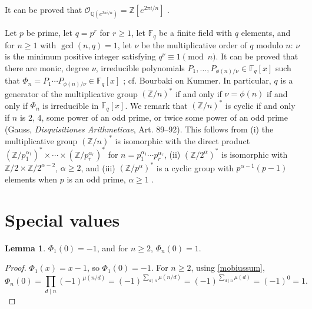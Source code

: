 \documentclass{article}
\theoremstyle{definition}
\newtheorem{lemma}[theorem]{Lemma}
\theoremstyle{definition}
\begin{document}
It can be proved that $\mathcal{O}_{\mathbb{Q}(e^{2\pi i/n})} = \mathbb{Z}[e^{2\pi i/n}]$ \cite[p.~60, Proposition 10.2]{neukirch}.







Let $p$ be prime, let $q=p^r$ for $r \geq 1$,  let $\mathbb{F}_q$ be a finite field with $q$ elements,
and for $n \geq 1$ with $\gcd(n,q)=1$, let $\nu$ be the multiplicative order of $q$ modulo $n$: $\nu$ is the minimum positive
integer satisfying $q^\nu \equiv 1 \pmod{n}$. It can be proved that
there are monic, degree $\nu$, irreducible polynomials
$P_1,\ldots,P_{\phi(n)/\nu} \in \mathbb{F}_q[x]$ such that
$\Phi_n = P_1 \cdots P_{\phi(n)/\nu} \in \mathbb{F}_q[x]$ \cite[p.~65, Theorem 2.47]{lidl}; cf.
Bourbaki \cite[p.~581]{commutative} on Kummer.
In particular, $q$ is a generator of the multiplicative group $(\mathbb{Z}/n)^*$ if and only if
$\nu=\phi(n)$ if and only if $\Phi_n$ is irreducible in $\mathbb{F}_q[x]$. We remark that $(\mathbb{Z}/n)^*$ is cyclic if and only if
$n$ is $2$, $4$, some power of an odd prime, or twice some power of an odd prime (Gauss, {\em Disquisitiones Arithmeticae}, Art. 89--92).
This 
 follows from (i) the multiplicative group $(\mathbb{Z}/n)^*$ is isomorphic with the direct product
$(\mathbb{Z}/p_1^{\alpha_1})^* \times \cdots \times (\mathbb{Z}/p_r^{\alpha_r})^*$ for $n=p_1^{\alpha_1} \cdots p_r^{\alpha_r}$,
(ii) $(\mathbb{Z}/2^\alpha)^*$ is isomorphic with $\mathbb{Z}/2 \times \mathbb{Z}/2^{\alpha-2}$, $\alpha \geq 2$,
and (iii) $(\mathbb{Z}/p^\alpha)^*$ is a cyclic group with $p^{\alpha-1}(p-1)$ elements when $p$ is an odd
prime, $\alpha \geq 1$ \cite[p.~314, Corollary 20]{dummit}.








\section{Special values}
\begin{lemma}
$\Phi_1(0)=-1$, and for $n \geq 2$, $\Phi_n(0)=1$.
\label{Phi0}
\end{lemma}
\begin{proof}
$\Phi_1(x)=x-1$, so $\Phi_1(0)=-1$. For $n \geq 2$, using \eqref{mobiussum},
\[
\Phi_n(0) = \prod_{d \mid n} (-1)^{\mu(n/d)} = (-1)^{\sum_{d \mid n} \mu(n/d)} = (-1)^{\sum_{d \mid n} \mu(d)}
=(-1)^0 = 1.
\]
\end{proof}
\end{document}
